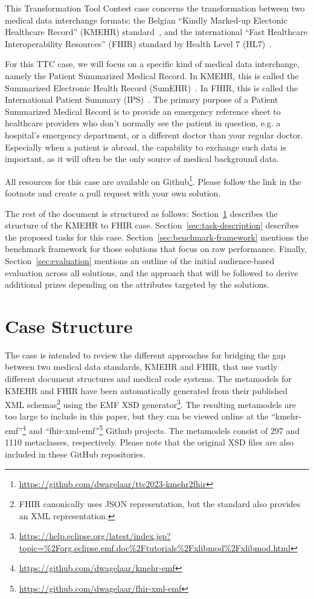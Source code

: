 \documentclass[
twocolumn,
]{ceurart}
\begin{document}
This Transformation Tool Contest case concerns the transformation between two
medical data interchange formats: the Belgian ``Kindly Marked-up Electonic
Healthcare Record'' (KMEHR) standard~\cite{kmehr_2023}, and the international
``Fast Healthcare Interoperability Resources'' (FHIR) standard by Health Level
7 (HL7)~\cite{fhir_2023}.

For this TTC case, we will focus on a specific kind of medical data 
interchange, namely the Patient Summarized Medical Record. In KMEHR, this is 
called the Summarized Electronic Health Record (SumEHR)~\cite{sumehr_2016}.
In FHIR, this is called the International Patient Summary
(IPS)~\cite{fhirips_2022}. The primary purpose of a Patient Summarized Medical
Record is to provide an emergency reference sheet to healthcare providers who 
don't normally see the patient in question, e.g. a hospital's emergency 
department, or a different doctor than your regular doctor.
Especially when a patient is abroad, the capability to exchange 
such data is important, as it will often be the only source of medical 
background data.

All resources for this case are available on
Github\footnote{\url{https://github.com/dwagelaar/ttc2023-kmehr2fhir}}.
Please follow the link in the footnote and create a pull request with your own
solution.

The rest of the document is structured as follows:
Section~\ref{sec:case-structure} describes the structure of the KMEHR to FHIR 
case. Section~\ref{sec:task-description} describes the proposed tasks for this
case. Section~\ref{sec:benchmark-framework} mentions the benchmark framework for
those solutions that focus on raw performance. Finally,
Section~\ref{sec:evaluation} mentions an outline of the initial audience-based
evaluation across all solutions, and the approach that will be followed to
derive additional prizes depending on the attributes targeted by the solutions.

\section{Case Structure}
\label{sec:case-structure}

The case is intended to review the different approaches for bridging the gap
between two medical data standards, KMEHR and FHIR, that use vastly different
document structures and medical code systems. The metamodels for
KMEHR and FHIR have been automatically generated from their published XML 
schemas\footnote{FHIR canonically uses JSON
representation, but the standard also provides an XML representation.}
using the EMF XSD generator\footnote{\url{https://help.eclipse.org/latest/index.jsp?topic=\%2Forg.eclipse.emf.doc\%2Ftutorials\%2Fxlibmod\%2Fxlibmod.html}}.
The resulting metamodels are too large to include in this paper, but they
can be viewed online at the
``kmehr-emf''\footnote{\url{https://github.com/dwagelaar/kmehr-emf}} and
``fhir-xml-emf''\footnote{\url{https://github.com/dwagelaar/fhir-xml-emf}}
Github projects. The metamodels consist of 297 and 1110 metaclasses,
respectively. Please note that the original XSD files are also included
in these GitHub repositories.
\end{document}
